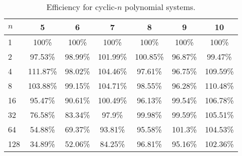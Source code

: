 \begin{table}[h]
\centering
\begin{tabular}{l||c|c|c|c|c|c|}
$n$ & 5 & 6 & 7 & 8 & 9 & 10\\ \hline
1 & 100\% & 100\% & 100\% & 100\% & 100\% & 100\%\\
2 & 97.53\% & 98.99\% & 101.99\% & 100.85\% & 96.87\% & 99.47\%\\
4 & 111.87\% & 98.02\% & 104.46\% & 97.61\% & 96.75\% & 109.59\%\\
8 & 103.88\% & 99.15\% & 104.71\% & 98.55\% & 96.28\% & 110.48\%\\
16 & 95.47\% & 90.61\% & 100.49\% & 96.13\% & 99.54\% & 106.78\%\\
32 & 76.58\% & 83.34\% & 97.9\% & 99.98\% & 99.59\% & 105.51\%\\
64 & 54.88\% & 69.37\% & 93.81\% & 95.58\% & 101.3\% & 104.53\%\\
128 & 34.89\% & 52.06\% & 84.25\% & 96.81\% & 95.16\% & 102.36\%\\
\end{tabular}
\caption{Efficiency for cyclic-$n$ polynomial systems.}
\label{CyclicParallelEfficiency}
\end{table}